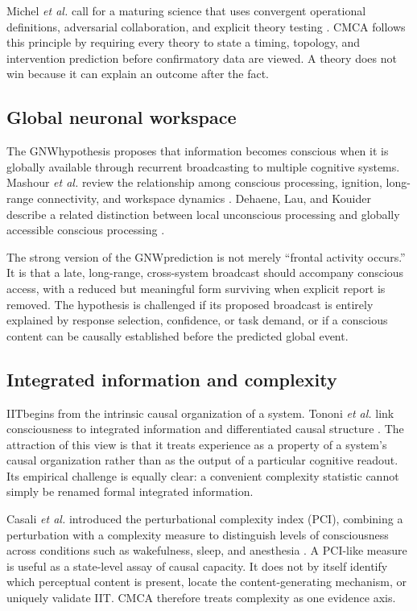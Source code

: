 \documentclass[conference]{IEEEtran}
\newcommand{\GNW}{\textsc{GNW}}
\newcommand{\IIT}{\textsc{IIT}}
\begin{document}
Michel \textit{et al.} call for a maturing science that uses convergent operational definitions, adversarial collaboration, and explicit theory testing \cite{michel2019}. CMCA follows this principle by requiring every theory to state a timing, topology, and intervention prediction before confirmatory data are viewed. A theory does not win because it can explain an outcome after the fact.

\subsection{Global neuronal workspace}

The \GNW hypothesis proposes that information becomes conscious when it is globally available through recurrent broadcasting to multiple cognitive systems. Mashour \textit{et al.} review the relationship among conscious processing, ignition, long-range connectivity, and workspace dynamics \cite{mashour2020}. Dehaene, Lau, and Kouider describe a related distinction between local unconscious processing and globally accessible conscious processing \cite{dehaene2017}.

The strong version of the \GNW prediction is not merely ``frontal activity occurs.'' It is that a late, long-range, cross-system broadcast should accompany conscious access, with a reduced but meaningful form surviving when explicit report is removed. The hypothesis is challenged if its proposed broadcast is entirely explained by response selection, confidence, or task demand, or if a conscious content can be causally established before the predicted global event.

\subsection{Integrated information and complexity}

\IIT begins from the intrinsic causal organization of a system. Tononi \textit{et al.} link consciousness to integrated information and differentiated causal structure \cite{tononi2016}. The attraction of this view is that it treats experience as a property of a system's causal organization rather than as the output of a particular cognitive readout. Its empirical challenge is equally clear: a convenient complexity statistic cannot simply be renamed formal integrated information.

Casali \textit{et al.} introduced the perturbational complexity index (PCI), combining a perturbation with a complexity measure to distinguish levels of consciousness across conditions such as wakefulness, sleep, and anesthesia \cite{casali2013}. A PCI-like measure is useful as a state-level assay of causal capacity. It does not by itself identify which perceptual content is present, locate the content-generating mechanism, or uniquely validate \IIT. CMCA therefore treats complexity as one evidence axis.
\end{document}
